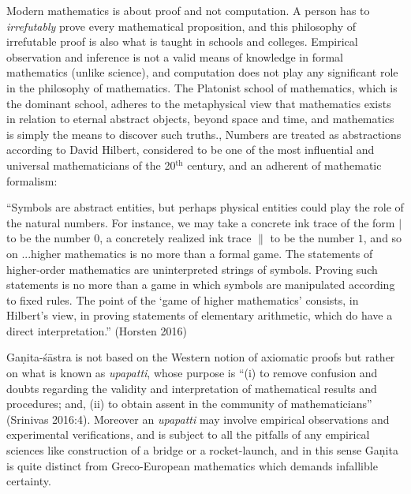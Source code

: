 Modern mathematics is about proof and not computation. A person has to {\sl irrefutably} prove every mathematical proposition, and this philosophy of irrefutable proof is also what is taught in schools and colleges. Empirical observation and inference is not a valid means of knowledge in formal mathematics (unlike science), and computation does not play any significant role in the philosophy of mathematics. The Platonist school of mathematics, which is the dominant school, adheres to the metaphysical view that mathematics exists in relation to eternal abstract objects, beyond space and time, and mathematics is simply the means to discover such truths., Numbers are treated as abstractions according to David Hilbert, considered to be one of the most influential and universal mathematicians of the 20$^{\text{th}}$ century, and an adherent of mathematic formalism: 
\begin{myquote}
``Symbols are abstract entities, but perhaps physical entities could play the role of the natural numbers. For instance, we may take a concrete ink trace of the form $|$ to be the number $0$, a concretely realized ink trace $\|$ to be the number $1$, and so on ...higher mathematics is no more than a formal game. The statements of higher-order mathematics are uninterpreted strings of symbols. Proving such statements is no more than a game in which symbols are manipulated according to fixed rules. The point of the `game of higher mathematics' consists, in Hilbert's view, in proving statements of elementary arithmetic, which do have a direct interpretation.''
\hfill 	(Horsten 2016)
\end{myquote}

Gaṇita-śāstra is not based on the Western notion of axiomatic proofs but rather on what is known as {\sl upapatti}, whose purpose is ``(i) to remove confusion and doubts regarding the validity and interpretation of mathematical results and procedures; and, (ii) to obtain assent in the community of mathematicians'' (Srinivas 2016:4). Moreover an {\sl upapatti} may involve empirical observations and experimental verifications, and is subject to all the pitfalls of any empirical sciences like construction of a bridge or a rocket-launch, and in this sense Gaṇita is quite distinct from Greco-European mathematics which demands infallible certainty.

